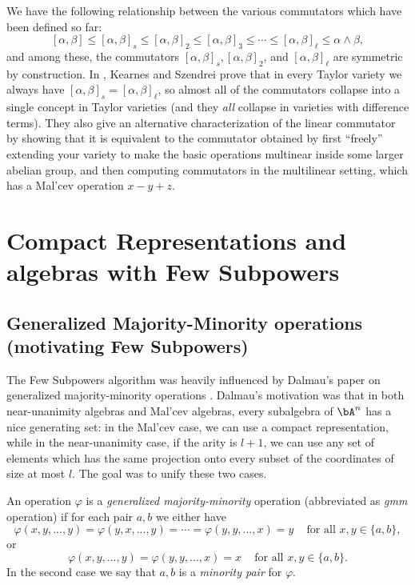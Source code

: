 We have the following relationship between the various commutators which have been defined so far:
\[
[\alpha,\beta] \le [\alpha,\beta]_s \le [\alpha,\beta]_2 \le [\alpha,\beta]_3 \le \cdots \le [\alpha,\beta]_\ell \le \alpha \wedge \beta,
\]
and among these, the commutators $[\alpha,\beta]_s, [\alpha, \beta]_2$, and $[\alpha,\beta]_\ell$ are symmetric by construction. In \cite{kearnes-taylor-affine}, Kearnes and Szendrei prove that in every Taylor variety we always have $[\alpha,\beta]_s = [\alpha,\beta]_\ell$, so almost all of the commutators collapse into a single concept in Taylor varieties (and they \emph{all} collapse in varieties with difference terms). They also give an alternative characterization of the linear commutator by showing that it is equivalent to the commutator obtained by first ``freely'' extending your variety to make the basic operations multinear inside some larger abelian group, and then computing commutators in the multilinear setting, which has a Mal'cev operation $x - y + z$.


\chapter{Compact Representations and algebras with Few Subpowers}\label{chapter-few-subpowers}


\section{Generalized Majority-Minority operations (motivating Few Subpowers)}

The Few Subpowers algorithm was heavily influenced by Dalmau's paper on generalized majority-minority operations \cite{dalmau-gmm}. Dalmau's motivation was that in both near-unanimity algebras and Mal'cev algebras, every subalgebra of $\bA^n$ has a nice generating set: in the Mal'cev case, we can use a compact representation, while in the near-unanimity case, if the arity is $l+1$, we can use any set of elements which has the same projection onto every subset of the coordinates of size at most $l$. The goal was to unify these two cases.

\begin{defn} An operation $\varphi$ is a \emph{generalized majority-minority} operation (abbreviated as \emph{gmm} operation) if for each pair $a,b$ we either have
\[
\varphi(x,y,...,y) = \varphi(y,x,...,y) = \cdots = \varphi(y,y,...,x) = y \;\;\; \text{ for all }x,y \in \{a,b\},
\]
or
\[
\varphi(x,y,...,y) = \varphi(y,y,...,x) = x \;\;\; \text{ for all }x,y \in \{a,b\}.
\]
In the second case we say that $a,b$ is a \emph{minority pair} for $\varphi$.
\end{defn}

